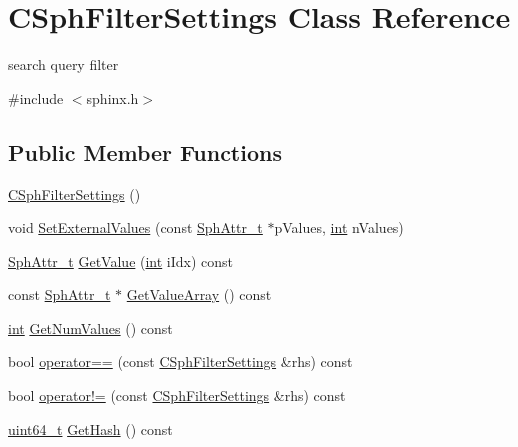 \hypertarget{classCSphFilterSettings}{\section{C\-Sph\-Filter\-Settings Class Reference}
\label{classCSphFilterSettings}
}


search query filter  




{\ttfamily \#include $<$sphinx.\-h$>$}

\subsection*{Public Member Functions}
\begin{DoxyCompactItemize}
\item 
\hyperlink{classCSphFilterSettings_a93f2f8a89bf1d7cbd50d07b0380f65c1}{C\-Sph\-Filter\-Settings} ()
\item 
void \hyperlink{classCSphFilterSettings_a1ec2474442720fbc33779c0c574e8e09}{Set\-External\-Values} (const \hyperlink{sphinx_8h_a7c122d91b0b52a0214ba176636bb1561}{Sph\-Attr\-\_\-t} $\ast$p\-Values, \hyperlink{sphinxexpr_8cpp_a4a26e8f9cb8b736e0c4cbf4d16de985e}{int} n\-Values)
\item 
\hyperlink{sphinx_8h_a7c122d91b0b52a0214ba176636bb1561}{Sph\-Attr\-\_\-t} \hyperlink{classCSphFilterSettings_a7142cfd6c996a7ffa9ed215763b184cf}{Get\-Value} (\hyperlink{sphinxexpr_8cpp_a4a26e8f9cb8b736e0c4cbf4d16de985e}{int} i\-Idx) const 
\item 
const \hyperlink{sphinx_8h_a7c122d91b0b52a0214ba176636bb1561}{Sph\-Attr\-\_\-t} $\ast$ \hyperlink{classCSphFilterSettings_aa1e1295b519fb958c04691f25fb70f81}{Get\-Value\-Array} () const 
\item 
\hyperlink{sphinxexpr_8cpp_a4a26e8f9cb8b736e0c4cbf4d16de985e}{int} \hyperlink{classCSphFilterSettings_a531e1dfc1f0a03dbaf74e3caa86d1eee}{Get\-Num\-Values} () const 
\item 
bool \hyperlink{classCSphFilterSettings_a9c7c2e254f61e64934234486dbe9cb0f}{operator==} (const \hyperlink{classCSphFilterSettings}{C\-Sph\-Filter\-Settings} \&rhs) const 
\item 
bool \hyperlink{classCSphFilterSettings_ac6c96e177e2b7bb8314d377a2b828c8c}{operator!=} (const \hyperlink{classCSphFilterSettings}{C\-Sph\-Filter\-Settings} \&rhs) const 
\item 
\hyperlink{sphinxstd_8h_aaa5d1cd013383c889537491c3cfd9aad}{uint64\-\_\-t} \hyperlink{classCSphFilterSettings_a62aaac3b64284ae4dffae38be8477458}{Get\-Hash} () const 
\end{DoxyCompactItemize}
